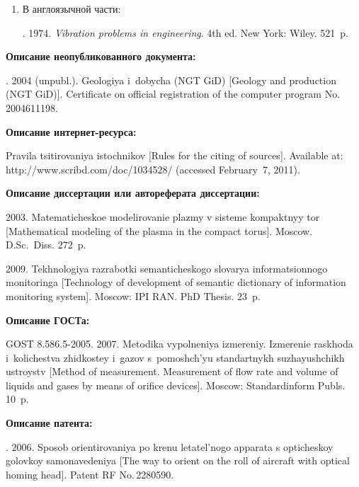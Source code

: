 {\begin{enumerate}[1.]
{\begin{enumerate}[1.]
Колебания в инженерном деле~/ Пер.\ с англ.~--- М.: Машиностроение, 1985. 472~с.
(
Vibration problems in engineering.~--- 4th ed.~--- New York, NY, USA: Wiley, 1974. 521~p.)\\[-13.5pt]
\item  В англоязычной части:

.
1974. \textit{Vibration problems in engineering}. 4th ed. New York: 
Wiley. 521~p.
\end{enumerate}

\vspace*{-3pt}


\noindent
\textbf{Описание неопубликованного документа:}


.
2004 (unpubl.). Geologiya i~dobycha (NGT GiD) [Geology and production (NGT GiD)]. Certificate on official registration of the computer program
No.\,2004611198. 

\noindent
\textbf{Описание интернет-ресурса:}


Pravila tsitirovaniya istochnikov [Rules for the citing of sources]. Available at: {\sf
http://www.scribd.com/doc/1034528/} (accessed February~7, 2011).


\noindent
\textbf{Описание диссертации или автореферата диссертации:}

2003. Matematicheskoe modelirovanie plazmy v sisteme kompaktnyy tor [Mathematical
modeling of the plasma in the compact torus].  Moscow.  D.Sc.\ Diss. 272~p.

 2009. Tekhnologiya razrabotki semanticheskogo
slovarya informatsionnogo monitoringa [Technology of development of
semantic dictionary of information monitoring system].  Moscow: IPI RAN. PhD Thesis. 23~p.


\noindent
\textbf{Описание ГОСТа:}

GOST 8.586.5-2005. 2007. Metodika vypolneniya izmereniy. Izmerenie raskhoda i~kolichestva zhidkostey i~gazov
s~pomoshch'yu standartnykh suzhayushchikh ustroystv [Method of measurement.
Measurement of flow rate and volume of liquids and gases by means of orifice devices]. Moscow:
Standardinform  Publs. 10~p.

\noindent
\textbf{Описание патента:}

.
2006. Sposob orientirovaniya po krenu letatel'nogo
apparata s opti\-che\-skoy golovkoy
samonavedeniya [The way to orient on the roll of aircraft with optical homing head].
Patent RF No.\,2280590.
}


\end{enumerate}}
